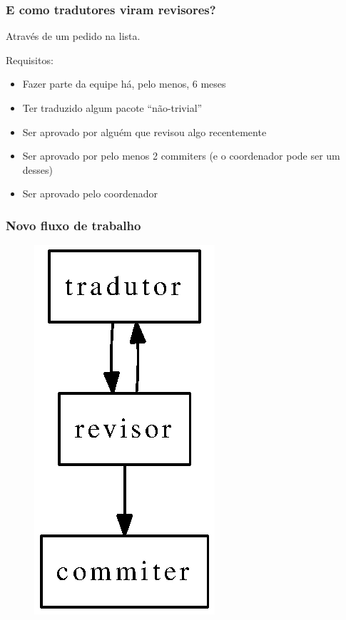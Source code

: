 \documentclass{beamer}
\begin{document}
\begin{frame}
    \frametitle{E como tradutores viram revisores?}
    Através de um pedido na lista.

    Requisitos:
    \begin{itemize}[<+->]
        \item Fazer parte da equipe há, pelo menos, 6 meses
        \item Ter traduzido algum pacote ``não-trivial''
        \item Ser aprovado por alguém que revisou algo recentemente
        \item Ser aprovado por pelo menos 2 commiters (e o coordenador pode ser um desses)
        \item Ser aprovado pelo coordenador
    \end{itemize}
\end{frame}



\begin{frame}
    \frametitle{Novo fluxo de trabalho}
    \begin{figure}[ht]
        \includegraphics{figures/fluxo_novo.eps}     
    \end{figure}
\end{frame}
\end{document}
